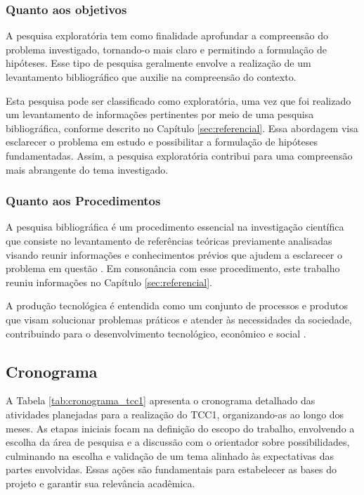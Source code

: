 \subsubsection{Quanto aos objetivos}

A pesquisa exploratória tem como finalidade aprofundar a compreensão do problema investigado, tornando-o mais claro e permitindo a formulação de hipóteses. Esse tipo de pesquisa geralmente envolve a realização de um levantamento bibliográfico que auxilie na compreensão do contexto.\cite{Gerhardt2009}

Esta pesquisa pode ser classificado como exploratória, uma vez que foi realizado um levantamento de informações pertinentes por meio de uma pesquisa bibliográfica, conforme descrito no Capítulo \ref{sec:referencial}. Essa abordagem visa esclarecer o problema em estudo e possibilitar a formulação de hipóteses fundamentadas. Assim, a pesquisa exploratória contribui para uma compreensão mais abrangente do tema investigado.



\subsubsection{Quanto aos Procedimentos}

A pesquisa bibliográfica é um procedimento essencial na investigação científica que consiste no levantamento de referências teóricas previamente analisadas visando reunir informações e conhecimentos prévios que ajudem a esclarecer o problema em questão \cite{Gerhardt2009}. Em consonância com esse procedimento, este trabalho reuniu informações no Capítulo \ref{sec:referencial}.

A produção tecnológica é entendida como um conjunto de processos e produtos que visam solucionar problemas práticos e atender às necessidades da sociedade, contribuindo para o desenvolvimento tecnológico, econômico e social \cite{Serzedello_Tomael_2011}.

\subsection{Cronograma}
\label{sec:cronograma}

A Tabela \ref{tab:cronograma_tcc1} apresenta o cronograma detalhado das atividades planejadas para a realização do TCC1, organizando-as ao longo dos meses. As etapas iniciais focam na definição do escopo do trabalho, envolvendo a escolha da área de pesquisa e a discussão com o orientador sobre possibilidades, culminando na escolha e validação de um tema alinhado às expectativas das partes envolvidas. Essas ações são fundamentais para estabelecer as bases do projeto e garantir sua relevância acadêmica.

